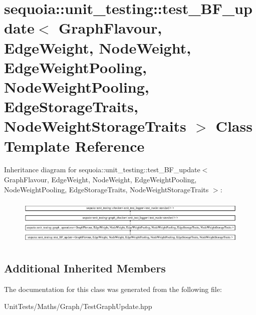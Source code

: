 \hypertarget{classsequoia_1_1unit__testing_1_1test___b_f__update}{}\section{sequoia\+::unit\+\_\+testing\+::test\+\_\+\+B\+F\+\_\+update$<$ Graph\+Flavour, Edge\+Weight, Node\+Weight, Edge\+Weight\+Pooling, Node\+Weight\+Pooling, Edge\+Storage\+Traits, Node\+Weight\+Storage\+Traits $>$ Class Template Reference}
\label{classsequoia_1_1unit__testing_1_1test___b_f__update}
Inheritance diagram for sequoia\+::unit\+\_\+testing\+::test\+\_\+\+B\+F\+\_\+update$<$ Graph\+Flavour, Edge\+Weight, Node\+Weight, Edge\+Weight\+Pooling, Node\+Weight\+Pooling, Edge\+Storage\+Traits, Node\+Weight\+Storage\+Traits $>$\+:\begin{figure}[H]
\begin{center}
\leavevmode
\includegraphics[height=2.251256cm]{classsequoia_1_1unit__testing_1_1test___b_f__update}
\end{center}
\end{figure}
\subsection*{Additional Inherited Members}


The documentation for this class was generated from the following file\+:\begin{DoxyCompactItemize}
\item 
Unit\+Tests/\+Maths/\+Graph/Test\+Graph\+Update.\+hpp\end{DoxyCompactItemize}
